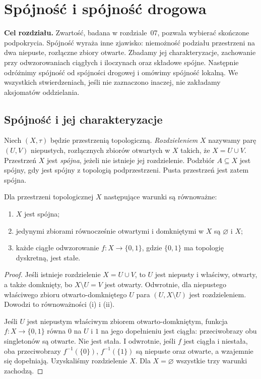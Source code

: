 \chapter{Spójność i spójność drogowa}
\label{ch:topog-spojnosc}

\noindent\textbf{Cel rozdziału.}
Zwartość, badana w rozdziale~07, pozwala wybierać skończone
podpokrycia. Spójność wyraża inne zjawisko: niemożność
podziału przestrzeni na dwa niepuste, rozłączne zbiory otwarte.
Zbadamy jej charakteryzacje, zachowanie przy odwzorowaniach
ciągłych i iloczynach oraz składowe spójne. Następnie
odróżnimy spójność od spójności drogowej i omówimy
spójność lokalną. We wszystkich stwierdzeniach, jeśli
nie zaznaczono inaczej, nie zakładamy aksjomatów oddzielania.

\section{Spójność i jej charakteryzacje}
\label{sec:topog-spojnosc-definicja}

\begin{definicja}
\label{def:topog-spojnosc}
Niech $(X,\tau)$ będzie przestrzenią topologiczną.
\emph{Rozdzieleniem} $X$ nazywamy parę $(U,V)$ niepustych,
rozłącznych zbiorów otwartych w $X$ takich, że $X=U\cup V$.
Przestrzeń $X$ jest \emph{spójna}, jeżeli nie istnieje
jej rozdzielenie. Podzbiór $A\subseteq X$ jest spójny,
gdy jest spójny z topologią podprzestrzeni.
Pusta przestrzeń jest zatem spójna.
\end{definicja}

\begin{twierdzenie}
\label{thm:topog-spojnosc-charakteryzacje}
Dla przestrzeni topologicznej $X$ następujące warunki
są równoważne:
\begin{enumerate}[label=\textup{(\roman*)}]
\item $X$ jest spójna;
\item jedynymi zbiorami równocześnie otwartymi i domkniętymi
w $X$ są $\varnothing$ i $X$;
\item każde ciągłe odwzorowanie $f:X\to\{0,1\}$,
gdzie $\{0,1\}$ ma topologię dyskretną, jest stałe.
\end{enumerate}
\end{twierdzenie}
\begin{proof}
Jeśli istnieje rozdzielenie $X=U\cup V$, to $U$
jest niepusty i właściwy, otwarty, a także domknięty,
bo $X\setminus U=V$ jest otwarty. Odwrotnie, dla
niepustego właściwego zbioru otwarto-domkniętego $U$
para $(U,X\setminus U)$ jest rozdzieleniem. Dowodzi
to równoważności (i) i (ii).

Jeśli $U$ jest niepustym właściwym zbiorem
otwarto-domkniętym, funkcja $f:X\to\{0,1\}$
równa $0$ na $U$ i $1$ na jego dopełnieniu jest
ciągła: przeciwobrazy obu singletonów są otwarte.
Nie jest stała. I odwrotnie, jeśli $f$ jest ciągła
i niestała, oba przeciwobrazy $f^{-1}(\{0\})$,
$f^{-1}(\{1\})$ są niepuste oraz otwarte,
a wzajemnie się dopełniają. Uzyskaliśmy
rozdzielenie $X$. Dla $X=\varnothing$ wszystkie
trzy warunki zachodzą.
\end{proof}

